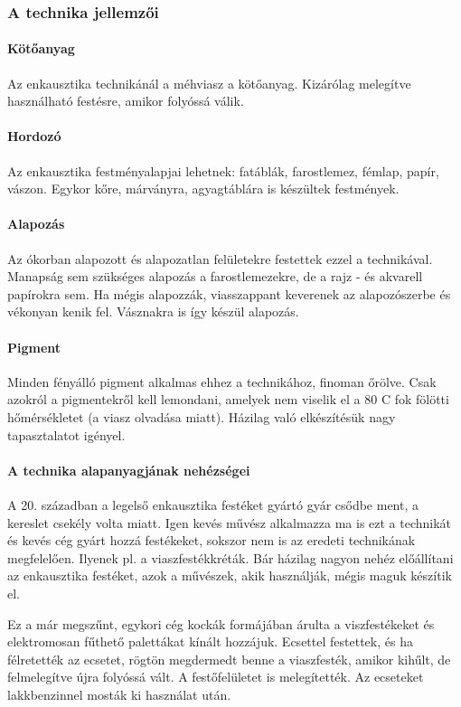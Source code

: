 \subsubsection{A technika jellemzői}

\paragraph{Kötőanyag}
Az enkausztika technikánál a méhviasz a kötőanyag. Kizárólag melegítve használható festésre, amikor folyóssá válik.

\paragraph{Hordozó}
Az enkausztika festményalapjai lehetnek: fatáblák, farostlemez, fémlap, papír, vászon. Egykor kőre, márványra, agyagtáblára is készültek festmények.

\paragraph{Alapozás}
Az ókorban alapozott és alapozatlan felületekre festettek ezzel a technikával. Manapság sem szükséges alapozás a farostlemezekre, de a rajz - és akvarell papírokra sem. Ha mégis alapozzák, viasszappant keverenek az alapozószerbe és vékonyan kenik fel. Vásznakra is így készül alapozás.

\paragraph{Pigment}
Minden fényálló pigment alkalmas ehhez a technikához, finoman őrölve. Csak azokról a pigmentekről kell lemondani, amelyek nem viselik el a 80 C fok fölötti hőmérsékletet (a viasz olvadása miatt). Házilag való elkészítésük nagy tapasztalatot igényel.

\paragraph{A technika alapanyagjának nehézségei}
A 20. században a legelső enkausztika festéket gyártó gyár csődbe ment, a kereslet csekély volta miatt. Igen kevés művész alkalmazza ma is ezt a technikát és kevés cég gyárt hozzá festékeket, sokszor nem is az eredeti technikának megfelelően. Ilyenek pl. a viaszfestékkréták. Bár házilag nagyon nehéz előállítani az enkausztika festéket, azok a művészek, akik használják, mégis maguk készítik el.

Ez a már megszűnt, egykori cég kockák formájában árulta a viszfestékeket és elektromosan fűthető palettákat kínált hozzájuk. Ecsettel festettek, és ha félretették az ecsetet, rögtön megdermedt benne a viaszfesték, amikor kihűlt, de felmelegítve újra folyóssá vált. A festőfelületet is melegítették. Az ecseteket lakkbenzinnel mosták ki használat után.

